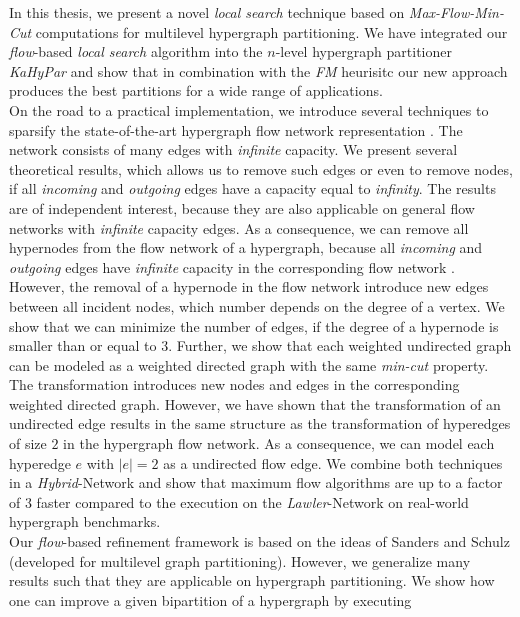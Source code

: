 In this thesis, we present a novel \emph{local search} technique based on \emph{Max-Flow-Min-Cut}
computations for multilevel hypergraph partitioning. We have integrated our \emph{flow}-based
\emph{local search} algorithm into the $n$-level hypergraph partitioner \emph{KaHyPar} and show that
in combination with the \emph{FM} heurisitc our new approach produces the best partitions
for a wide range of applications.\\
On the road to a practical implementation, we introduce several techniques to 
sparsify the state-of-the-art hypergraph flow network representation \cite{lawler1973}. 
The network consists of many edges with \emph{infinite} capacity. We present
several theoretical results, which allows us to remove such edges or even to remove
nodes, if all \emph{incoming} and \emph{outgoing} edges have a capacity equal to
\emph{infinity}. The results are of independent interest, because they are also
applicable on general flow networks with \emph{infinite} capacity edges. 
As a consequence, we can remove all hypernodes from the flow network 
of a hypergraph, because all \emph{incoming} and \emph{outgoing} edges have
\emph{infinite} capacity in the corresponding flow network \cite{lawler1973}. 
However, the removal of a hypernode in the flow 
network introduce new edges between all incident nodes, which number depends
on the degree of a vertex. We show that we can minimize the number of edges, if the
degree of a hypernode is smaller than or equal to $3$. Further, we show that each weighted undirected
graph can be modeled as a weighted directed graph with the same \emph{min-cut}
property. The transformation introduces new nodes and edges in the corresponding
weighted directed graph. However, we have shown that the transformation of an undirected
edge results in the same structure as the transformation of hyperedges of size $2$
in the hypergraph flow network. As a consequence, we can model each hyperedge $e$ with
$|e| = 2$ as a undirected flow edge. We combine both techniques in a \emph{Hybrid}-Network 
and show that maximum flow algorithms are up to a factor of $3$ faster compared to
the execution on the \emph{Lawler}-Network \cite{lawler1973} on real-world hypergraph benchmarks. \\
Our \emph{flow}-based refinement framework is based on the ideas of Sanders and Schulz
\cite{sanders2011engineering} (developed for multilevel graph partitioning). However,
we generalize many results such that they are applicable on hypergraph partitioning.
We show how one can improve a given bipartition of a hypergraph by executing
